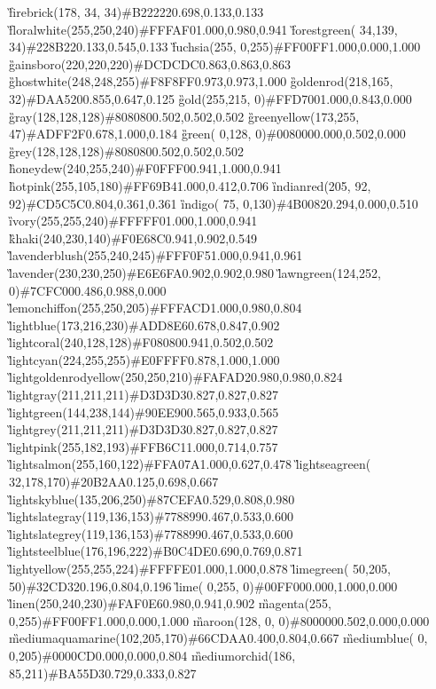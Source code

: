 \G{firebrick}{(178, 34, 34)}{\#B22222}{0.698,0.133,0.133}
\G{floralwhite}{(255,250,240)}{\#FFFAF0}{1.000,0.980,0.941}
\G{forestgreen}{( 34,139, 34)}{\#228B22}{0.133,0.545,0.133}
\G{fuchsia}{(255,  0,255)}{\#FF00FF}{1.000,0.000,1.000}
\G{gainsboro}{(220,220,220)}{\#DCDCDC}{0.863,0.863,0.863}
\G{ghostwhite}{(248,248,255)}{\#F8F8FF}{0.973,0.973,1.000}
\G{goldenrod}{(218,165, 32)}{\#DAA520}{0.855,0.647,0.125}
\G{gold}{(255,215,  0)}{\#FFD700}{1.000,0.843,0.000}
\G{gray}{(128,128,128)}{\#808080}{0.502,0.502,0.502}
\G{greenyellow}{(173,255, 47)}{\#ADFF2F}{0.678,1.000,0.184}
\G{green}{(  0,128,  0)}{\#008000}{0.000,0.502,0.000}
\G{grey}{(128,128,128)}{\#808080}{0.502,0.502,0.502}
\G{honeydew}{(240,255,240)}{\#F0FFF0}{0.941,1.000,0.941}
\G{hotpink}{(255,105,180)}{\#FF69B4}{1.000,0.412,0.706}
\G{indianred}{(205, 92, 92)}{\#CD5C5C}{0.804,0.361,0.361}
\G{indigo}{( 75,  0,130)}{\#4B0082}{0.294,0.000,0.510}
\G{ivory}{(255,255,240)}{\#FFFFF0}{1.000,1.000,0.941}
\G{khaki}{(240,230,140)}{\#F0E68C}{0.941,0.902,0.549}
\G{lavenderblush}{(255,240,245)}{\#FFF0F5}{1.000,0.941,0.961}
\G{lavender}{(230,230,250)}{\#E6E6FA}{0.902,0.902,0.980}
\G{lawngreen}{(124,252,  0)}{\#7CFC00}{0.486,0.988,0.000}
\G{lemonchiffon}{(255,250,205)}{\#FFFACD}{1.000,0.980,0.804}
\G{lightblue}{(173,216,230)}{\#ADD8E6}{0.678,0.847,0.902}
\G{lightcoral}{(240,128,128)}{\#F08080}{0.941,0.502,0.502}
\G{lightcyan}{(224,255,255)}{\#E0FFFF}{0.878,1.000,1.000}
\G{lightgoldenrodyellow}{(250,250,210)}{\#FAFAD2}{0.980,0.980,0.824}
\G{lightgray}{(211,211,211)}{\#D3D3D3}{0.827,0.827,0.827}
\G{lightgreen}{(144,238,144)}{\#90EE90}{0.565,0.933,0.565}
\G{lightgrey}{(211,211,211)}{\#D3D3D3}{0.827,0.827,0.827}
\G{lightpink}{(255,182,193)}{\#FFB6C1}{1.000,0.714,0.757}
\G{lightsalmon}{(255,160,122)}{\#FFA07A}{1.000,0.627,0.478}
\G{lightseagreen}{( 32,178,170)}{\#20B2AA}{0.125,0.698,0.667}
\G{lightskyblue}{(135,206,250)}{\#87CEFA}{0.529,0.808,0.980}
\G{lightslategray}{(119,136,153)}{\#778899}{0.467,0.533,0.600}
\G{lightslategrey}{(119,136,153)}{\#778899}{0.467,0.533,0.600}
\G{lightsteelblue}{(176,196,222)}{\#B0C4DE}{0.690,0.769,0.871}
\G{lightyellow}{(255,255,224)}{\#FFFFE0}{1.000,1.000,0.878}
\G{limegreen}{( 50,205, 50)}{\#32CD32}{0.196,0.804,0.196}
\G{lime}{(  0,255,  0)}{\#00FF00}{0.000,1.000,0.000}
\G{linen}{(250,240,230)}{\#FAF0E6}{0.980,0.941,0.902}
\G{magenta}{(255,  0,255)}{\#FF00FF}{1.000,0.000,1.000}
\G{maroon}{(128,  0,  0)}{\#800000}{0.502,0.000,0.000}
\G{mediumaquamarine}{(102,205,170)}{\#66CDAA}{0.400,0.804,0.667}
\G{mediumblue}{(  0,  0,205)}{\#0000CD}{0.000,0.000,0.804}
\G{mediumorchid}{(186, 85,211)}{\#BA55D3}{0.729,0.333,0.827}
